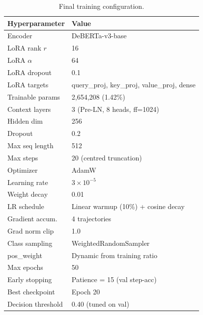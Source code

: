 \documentclass[11pt]{article}
\begin{document}
\begin{table}[h]
\centering
\caption{Final training configuration.}
\begin{tabular}{ll}
\toprule
\textbf{Hyperparameter} & \textbf{Value} \\
\midrule
Encoder            & DeBERTa-v3-base \\
LoRA rank $r$      & 16 \\
LoRA $\alpha$      & 64 \\
LoRA dropout       & 0.1 \\
LoRA targets       & query\_proj, key\_proj, value\_proj, dense \\
Trainable params   & 2,654,208 (1.42\%) \\
Context layers     & 3 (Pre-LN, 8 heads, ff=1024) \\
Hidden dim         & 256 \\
Dropout            & 0.2 \\
Max seq length     & 512 \\
Max steps          & 20 (centred truncation) \\
Optimizer          & AdamW \\
Learning rate      & $3 \times 10^{-5}$ \\
Weight decay       & 0.01 \\
LR schedule        & Linear warmup (10\%) + cosine decay \\
Gradient accum.    & 4 trajectories \\
Grad norm clip     & 1.0 \\
Class sampling     & WeightedRandomSampler \\
pos\_weight        & Dynamic from training ratio \\
Max epochs         & 50 \\
Early stopping     & Patience = 15 (val step-acc) \\
Best checkpoint    & Epoch 20 \\
Decision threshold & 0.40 (tuned on val) \\
\bottomrule
\end{tabular}
\end{table}
\end{document}
